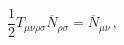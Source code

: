 \begin{equation}
  \frac{1}{2}T_{\mu\nu\rho\sigma}\overline{N}_{\rho\sigma}=
\overline{N}_{\mu\nu}\,,\label{eq:2.14}
\end{equation}

